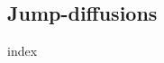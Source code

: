 \documentclass[leqno]{./preamble/ucthesis-CA2012}
\begin{document}
\begin{appendix}
  \chapter{Jump-diffusions}
  \label{jump-diffusions}
  {index}

  \clearpage
  
\end{appendix}
\end{document}
